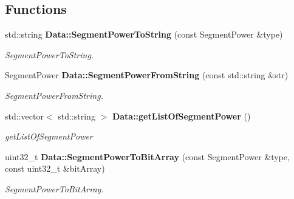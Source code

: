 \subsection*{Functions}
\begin{DoxyCompactItemize}
\item 
std\+::string \textbf{ Data\+::\+Segment\+Power\+To\+String} (const Segment\+Power \&type)
\begin{DoxyCompactList}\small\item\em Segment\+Power\+To\+String. \end{DoxyCompactList}\item 
Segment\+Power \textbf{ Data\+::\+Segment\+Power\+From\+String} (const std\+::string \&str)
\begin{DoxyCompactList}\small\item\em Segment\+Power\+From\+String. \end{DoxyCompactList}\item 
std\+::vector$<$ std\+::string $>$ \textbf{ Data\+::get\+List\+Of\+Segment\+Power} ()
\begin{DoxyCompactList}\small\item\em get\+List\+Of\+Segment\+Power \end{DoxyCompactList}\item 
uint32\+\_\+t \textbf{ Data\+::\+Segment\+Power\+To\+Bit\+Array} (const Segment\+Power \&type, const uint32\+\_\+t \&bit\+Array)
\begin{DoxyCompactList}\small\item\em Segment\+Power\+To\+Bit\+Array. \end{DoxyCompactList}\end{DoxyCompactItemize}
